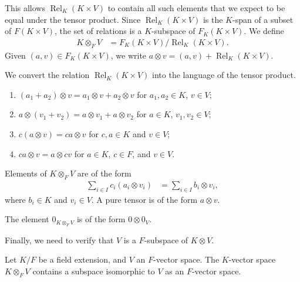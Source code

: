 \documentclass[10pt]{mypackage}
\begin{document}
\begin{definition}
\begin{enumerate}[(1)]
  \end{enumerate}
  This allows $\operatorname{Rel}_{K}\left(K\times V\right)$ to contain all such elements that we expect to be equal under the tensor product. Since $\operatorname{Rel}_{K}\left(K\times V\right)$ is the $K$-span of a subset of $F\left(K\times V\right)$, the set of relations is a $K$-subspace of $F_{K}\left(K\times V\right)$. We define
  \begin{align*}
    K\otimes_{F}V &= F_{K}\left(K\times V\right)/\operatorname{Rel}_{K}\left(K\times V\right).
  \end{align*}
  Given $\left(a,v\right)\in F_{K}\left(K\times V\right)$, we write $a\otimes v = \left(a,v\right) + \operatorname{Rel}_{K}\left(K\times V\right)$.\newline

  We convert the relation $\operatorname{Rel}_{K}\left(K\times V\right)$ into the language of the tensor product.
  \begin{enumerate}[(1)]
    \item $\left(a_1 + a_2\right)\otimes v = a_1\otimes v + a_2\otimes v$ for $a_1,a_2\in K$, $v\in V$;
    \item $a\otimes \left(v_1 + v_2\right) = a\otimes v_1 + a\otimes v_2$ for $a\in K$, $v_1,v_2\in V$;
    \item $c\left(a\otimes v\right) = ca\otimes v$ for $c,a\in K$ and $v\in V$;
    \item $ca\otimes v = a\otimes cv$ for $a\in K$, $c\in F$, and $v\in V$.
  \end{enumerate}
  Elements of $K\otimes_{F}V$ are of the form
  \begin{align*}
    \sum_{i\in I}c_i\left(a_i\otimes v_i\right) &= \sum_{i\in I}b_i\otimes v_i,
  \end{align*}
  where $b_i\in K$ and $v_i\in V$. A pure tensor is of the form $a\otimes v$.\newline

  The element $0_{K\otimes_{F}V}$ is of the form $0\otimes 0_{V}$.\newline

  Finally, we need to verify that $V$ is a $F$-subspace of $K\otimes V$.
\end{definition}
\begin{proposition}
  Let $K/F$ be a field extension, and $V$ an $F$-vector space. The $K$-vector space $K\otimes_{F}V$ contains a subspace isomorphic to $V$ as an $F$-vector space.
\end{proposition}
\end{document}
